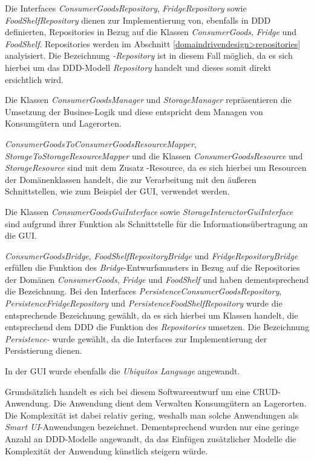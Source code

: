 Die Interfaces \textit{ConsumerGoodsRepository}, \textit{FridgeRepository} sowie \textit{FoodShelfRepository} dienen zur Implementierung von, ebenfalls in \ac{DDD} definierten, Repositories in Bezug auf die Klassen \textit{ConsumerGoods}, \textit{Fridge} und \textit{FoodShelf}.
Repositories werden im Abschnitt \ref{domaindrivendesign>repositories} analyisiert.
Die Bezeichnung \textit{-Repository} ist in diesem Fall möglich, da es sich hierbei um das \ac{DDD}-Modell \textit{Repository} handelt und dieses somit direkt ersichtlich wird.

Die Klassen \textit{ConsumerGoodsManager} und \textit{StorageManager} repräsentieren die Umsetzung der Busines-Logik und diese entspricht dem Managen von Konsumgütern und Lagerorten. 

\textit{ConsumerGoodsToConsumerGoodsResourceMapper}, \textit{StorageToStorageResourceMapper} und die Klassen \textit{ConsumerGoodsResource} und \textit{StorageResource} sind mit dem Zusatz -Resource, da es sich hierbei um Resourcen der Domänenklassen handelt, die zur Verarbeitung mit den äußeren Schnittstellen, wie zum Beispiel der \ac{GUI}, verwendet werden.

Die Klassen \textit{ConsumerGoodsGuiInterface} sowie \textit{StorageInteractorGuiInterface} sind aufgrund ihrer Funktion als Schnittstelle für die Informationsübertragung an die GUI.

\textit{ConsumerGoodsBridge}, \textit{FoodShelfRepositoryBridge} und \textit{FridgeRepositoryBridge} erfüllen die Funktion des \textit{Bridge}-Entwurfsmusters in Bezug auf die Repositories der Domänen \textit{ConsumerGoods}, \textit{Fridge} und \textit{FoodShelf} und haben dementsprechend die Bezeichnung.
Bei den Interfaces \textit{PersistenceConsumerGoodsRepository}, \textit{PersistenceFridgeRepository} und \textit{PersistenceFoodShelfRepository} wurde die entsprechende Bezeichnung gewählt, da es sich hierbei um Klassen handelt, die entsprechend dem \ac{DDD} die Funktion des \textit{Repositories} umsetzen.
Die Bezeichnung \textit{Persistence-} wurde gewählt, da die Interfaces zur Implementierung der Persistierung dienen.


In der GUI wurde ebenfalls die \textit{Ubiquitos Language} angewandt.

Grundsätzlich handelt es sich bei diesem Softwareentwurf um eine \ac{CRUD}-Anwendung.
Die Anwendung dient dem Verwalten Konsumgütern an Lagerorten.
Die Komplexität ist dabei relativ gering, weshalb man solche Anwendungen als \textit{Smart UI}-Anwendungen bezeichnet.
Dementsprechend wurden nur eine geringe Anzahl an \ac{DDD}-Modelle angewandt, da das Einfügen zusätzlicher Modelle die Komplexität der Anwendung künstlich steigern würde.


